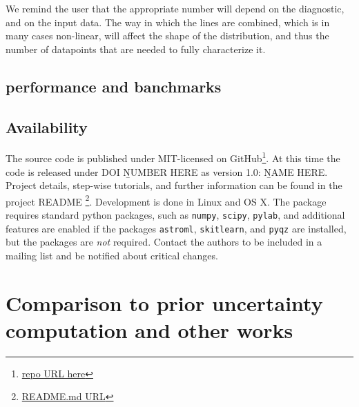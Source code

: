 \documentclass{emulateapj}
\begin{document}
We remind the user that the appropriate number will depend on the diagnostic, and on the input data. The way in which the lines are combined, which is in many cases non-linear, will affect the shape of the distribution, and thus the number of datapoints that are needed to fully characterize it. 


\subsection{performance and banchmarks}

\subsection{Availability}
The source code is published under MIT-licensed on GitHub\footnote{\url{repo URL here}}. At this time the code is released under DOI {\b NUMBER HERE} as version 1.0: {\b NAME HERE}. Project
details, step-wise tutorials, and further information can be found in the project README \footnote{\url{README.md URL}}.
Development is done in Linux and OS X. The package requires standard python packages, such as \verb=numpy=, \verb=scipy=, \verb=pylab=, and additional features are enabled if the packages \verb=astroml=, \verb=skitlearn=, and \verb=pyqz= are installed, but the packages are \emph{not} required. Contact the authors to be included in a mailing list and be notified about critical changes. 




\section{Comparison to prior uncertainty computation and other works }\label{comp_sec}
\end{document}
